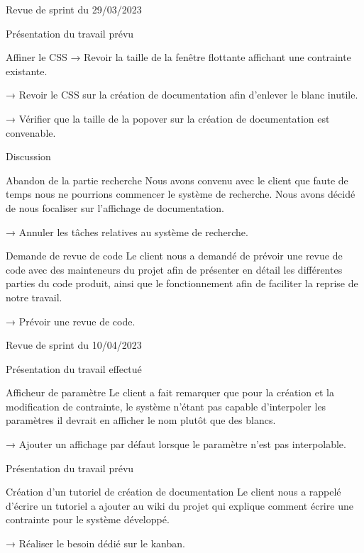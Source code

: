 \documentclass[]{article}
\begin{document}
{\begin{section}{Revue de sprint du 29/03/2023}
\begin{subsection}{Présentation du travail prévu}
\begin{subsubsection}{Affiner le CSS}
         → Revoir la taille de la fenêtre flottante affichant une contrainte existante.

         → Revoir le CSS sur la création de documentation afin d’enlever le blanc inutile.

         → Vérifier que la taille de la popover sur la création de documentation est convenable.
     \end{subsubsection}
 \end{subsection}

 \begin{subsection}{Discussion}
     \begin{subsubsection}{Abandon de la partie recherche}
         Nous avons convenu avec le client que faute de temps nous ne pourrions commencer le système de recherche. Nous avons décidé de nous focaliser sur l’affichage de documentation.

         → Annuler les tâches relatives au système de recherche.
     \end{subsubsection}

     \begin{subsubsection}{Demande de revue de code}
         Le client nous a demandé de prévoir une revue de code avec des mainteneurs du projet afin de présenter en détail les différentes parties du code produit, ainsi que le fonctionnement afin de faciliter la reprise de notre travail.

         → Prévoir une revue de code.
     \end{subsubsection}
 \end{subsection}
\end{section}

\begin{section}{Revue de sprint du 10/04/2023}
    \begin{subsection}{Présentation du travail effectué}
        \begin{subsubsection}{Afficheur de paramètre}
            Le client a fait remarquer que pour la création et la modification de contrainte, le système n'étant pas capable d'interpoler les paramètres il devrait en afficher le nom plutôt que des blancs.

            → Ajouter un affichage par défaut lorsque le paramètre n'est pas interpolable.
        \end{subsubsection}
    \end{subsection}
   
    \begin{subsection}{Présentation du travail prévu}
        \begin{subsubsection}{Création d'un tutoriel de création de documentation}
            Le client nous a rappelé d'écrire un tutoriel a ajouter au wiki du projet qui explique comment écrire une contrainte pour le système développé.

            → Réaliser le besoin dédié sur le kanban.
        \end{subsubsection}
    \end{subsection}
   \end{section}
}
\end{document}
